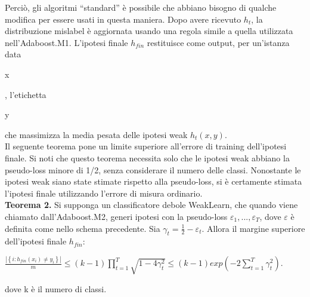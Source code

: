 Perci\`o, gli algoritmi ``standard'' \`e possibile che abbiano bisogno di qualche modifica per essere usati 
in questa maniera. Dopo avere ricevuto \begin{math}h_t\end{math}, 
la distribuzione mislabel \`e aggiornata usando una regola simile a quella utilizzata nell'Adaboost.M1. 
L'ipotesi finale \begin{math}h_{fin}\end{math} restituisce come output, per un'istanza data \begin{it}x\end{it}, 
l'etichetta \begin{it}y\end{it} che massimizza la media pesata delle ipotesi weak \begin{math}h_t(x,y)\end{math}.\\
\newline
Il seguente teorema pone un limite superiore all'errore di training dell'ipotesi finale. Si noti che questo teorema 
necessita solo che le ipotesi weak abbiano la pseudo-loss minore di 1/2, senza considerare il numero delle classi.
Nonostante le ipotesi weak siano state stimate rispetto alla pseudo-loss, si \`e certamente stimata l'ipotesi 
finale utilizzando l'errore di misura ordinario.\\
\newline
\textbf{Teorema 2.} Si supponga un classificatore debole WeakLearn, che quando viene chiamato dall'Adaboost.M2, 
generi ipotesi con la pseudo-loss \begin{math}\varepsilon_1, ... ,\varepsilon_T\end{math}, dove \begin{math}\varepsilon\end{math}
\`e definita come nello schema precedente. Sia \begin{math}\gamma_t = \frac{1}{2}-\varepsilon_t\end{math}.
 Allora il margine superiore dell'ipotesi finale \begin{math}h_{fin}\end{math}:
\begin{center}
\begin{math}\frac{|\left\{i : h_{fin}(x_i)\ne y_i\right\}|}{m} \le (k-1)\prod_{t=1}^T\sqrt{1-4\gamma_t^2}
\le (k-1)exp\left(-2\sum_{t=1}^T\gamma_t^2\right)\end{math}. 
\end{center}


dove k \`e il numero di classi.\\







